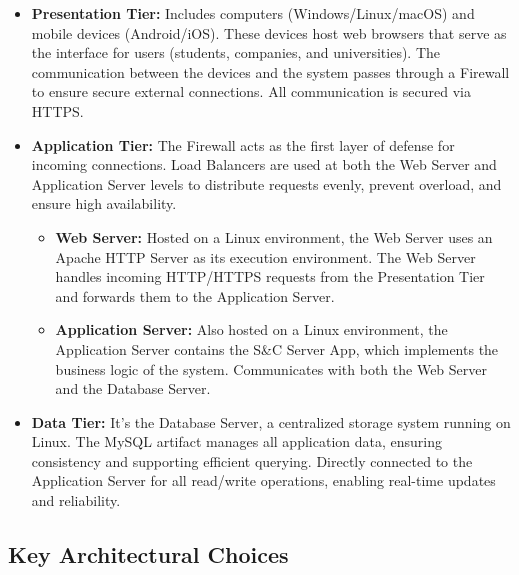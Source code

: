 \begin{itemize}
    \item 
        \textbf{Presentation Tier:} Includes computers (Windows/Linux/macOS) and mobile devices (Android/iOS). These devices host web browsers that serve as the interface for users (students, companies, and universities). The communication between the devices and the system passes through a Firewall to ensure secure external connections. All communication is secured via HTTPS.
    \item 
        \textbf{Application Tier:} The Firewall acts as the first layer of defense for incoming connections. Load Balancers are used at both the Web Server and Application Server levels to distribute requests evenly, prevent overload, and ensure high availability.
        \begin{itemize}
            \item 
                \textbf{Web Server:}
                    Hosted on a Linux environment, the Web Server uses an Apache HTTP Server as its execution environment. The Web Server handles incoming HTTP/HTTPS requests from the Presentation Tier and forwards them to the Application Server.
            \item 
                \textbf{Application Server:}
                    Also hosted on a Linux environment, the Application Server contains the S\&C Server App, which implements the business logic of the system. Communicates with both the Web Server and the Database Server.
        \end{itemize}
    \item 
        \textbf{Data Tier:} It's the Database Server, a centralized storage system running on Linux. The MySQL artifact manages all application data, ensuring consistency and supporting efficient querying. Directly connected to the Application Server for all read/write operations, enabling real-time updates and reliability.
\end{itemize}

\subsection{Key Architectural Choices}

